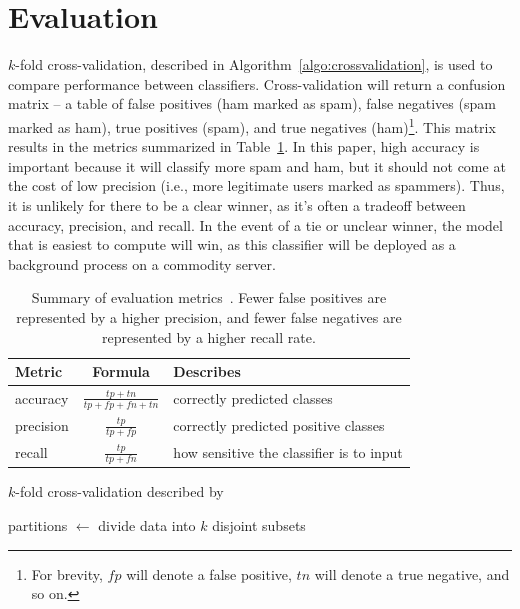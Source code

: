\documentclass[10pt]{article}
\begin{document}
\section{Evaluation}
\label{sect:eval}
$k$-fold cross-validation, described in Algorithm~\ref{algo:crossvalidation},
is used to compare performance between classifiers. Cross-validation will
return a confusion matrix -- a table of false positives (ham marked as spam),
false negatives (spam marked as ham), true positives (spam), and true
negatives (ham)\footnote{For brevity, $fp$ will denote a false positive, $tn$
  will denote a true negative, and so on.}. This matrix results in the metrics
summarized in Table~\ref{table:metrics}. In this paper, high accuracy is
important because it will classify more spam and ham, but it should not come
at the cost of low precision (i.e., more legitimate users marked as spammers).
Thus, it is unlikely for there to be a clear winner, as it's often a tradeoff
between accuracy, precision, and recall. In the event of a tie or unclear
winner, the model that is easiest to compute will win, as this classifier will
be deployed as a background process on a commodity server.

\begin{table}[b]
  \centering
  \caption{Summary of evaluation metrics~\cite{eval}. Fewer false positives
    are represented by a higher precision, and fewer false negatives are
    represented by a higher recall rate.}
  \label{table:metrics}
  \begin{tabular}{lcl}
    \toprule
    Metric & Formula & Describes \\ \midrule
  accuracy & $\frac{tp + tn}{tp + fp + fn + tn}$ & correctly predicted classes \\
  precision & $\frac{tp}{tp + fp}$ & correctly predicted positive classes\\
  recall & $\frac{tp}{tp + fn}$ & how sensitive the classifier is to input \\\bottomrule
  \end{tabular}
\end{table}

\begin{algorithm}[t]
  \caption{$k$-fold cross-validation described by~\cite[p147]{mitchell}}
  \begin{algorithmic}
    \State partitions $\gets$ divide data into $k$ disjoint subsets
    \State {}
    \EndFor
    \EndFunction
  \end{algorithmic}\label{algo:crossvalidation}
\end{algorithm}
\end{document}
